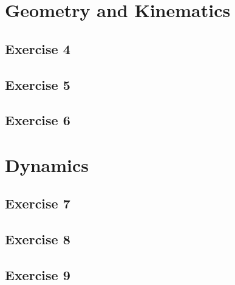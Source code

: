 \section{Geometry and Kinematics}
\subsection{Exercise 4}
\lipsum[7]

\begin{solution}
    \lipsum[8]
\end{solution}

\subsection{Exercise 5}
\lipsum[9]

\begin{solution}
    \lipsum[10]
\end{solution}

\subsection{Exercise 6}
\lipsum[11]

\begin{solution}
    \lipsum[12]
\end{solution}

\section{Dynamics}
\subsection{Exercise 7}
\lipsum[13]

\begin{solution}
    \lipsum[14]
\end{solution}

\subsection{Exercise 8}
\lipsum[15]

\begin{solution}
    \lipsum[16]
\end{solution}

\subsection{Exercise 9}
\lipsum[17]

\begin{solution}
    \lipsum[18]
\end{solution}
